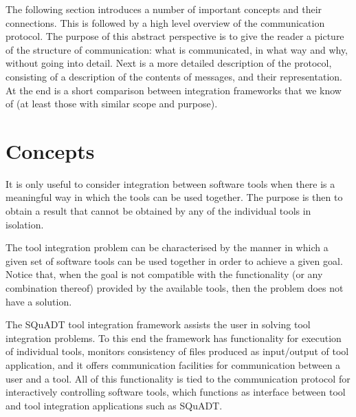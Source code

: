 \documentclass{article}
\newcommand{\squadt}{SQuADT\xspace}
\begin{document}
  The following section introduces a number of important concepts and their
  connections. This is followed by a high level overview of the communication
  protocol.  The purpose of this abstract perspective is to give the reader a
  picture of the structure of communication: what is communicated, in what way
  and why, without going into detail. Next is a more detailed description of
  the protocol, consisting of a description of the contents of messages, and
  their representation.  At the end is a short comparison between integration
  frameworks that we know of (at least those with similar scope and purpose).

 \section{Concepts}

   It is only useful to consider integration between software tools when there
   is a meaningful way in which the tools can be used together. The purpose is
   then to obtain a result that cannot be obtained by any of the individual
   tools in isolation.

   The tool integration problem can be characterised by the manner in which a
   given set of software tools can be used together in order to achieve a given
   goal. Notice that, when the goal is not compatible with the functionality
   (or any combination thereof) provided by the available tools, then the
   problem does not have a solution.

   The \squadt tool integration framework assists the user in solving tool
   integration problems. To this end the framework has functionality for
   execution of individual tools, monitors consistency of files produced as
   input/output of tool application, and it offers communication facilities for
   communication between a user and a tool. All of this functionality is tied
   to the communication protocol for interactively controlling software tools,
   which functions as interface between tool and tool integration applications
   such as \squadt.


\end{document}
